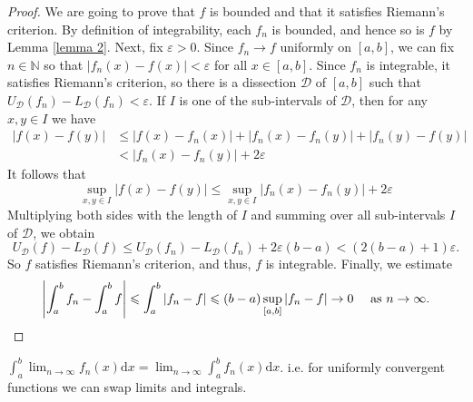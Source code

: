 \documentclass[a4paper]{article}
\begin{document}
\begin{proof}
    We are going to prove that $f$ is bounded and that it satisfies Riemann's criterion. By definition of integrability, each $f_{n}$ is bounded, and hence so is $f$ by Lemma \ref{lemma 2}.
    Next, fix $\varepsilon>0$. Since $f_{n} \rightarrow f$ uniformly on $[a, b]$, we can fix $n \in \mathbb{N}$ so that $\left|f_{n}(x)-f(x)\right|<\varepsilon$ for all $x \in[a, b]$. Since $f_{n}$ is integrable, it satisfies Riemann's criterion, so there is a dissection $\mathcal{D}$ of $[a, b]$ such that $U_{\mathcal{D}}\left(f_{n}\right)-L_{\mathcal{D}}\left(f_{n}\right)<\varepsilon$. If $I$ is one of the sub-intervals of $\mathcal{D}$, then for any $x, y \in I$ we have
    \[
    \begin{aligned}
    |f(x)-f(y)| & \leqslant\left|f(x)-f_{n}(x)\right|+\left|f_{n}(x)-f_{n}(y)\right|+\left|f_{n}(y)-f(y)\right| \\
    &<\left|f_{n}(x)-f_{n}(y)\right|+2 \varepsilon
    \end{aligned}
    \]
    It follows that
    \[
    \sup _{x, y \in I}|f(x)-f(y)| \leqslant \sup _{x, y \in I}\left|f_{n}(x)-f_{n}(y)\right|+2 \varepsilon
    \]
    Multiplying both sides with the length of $I$ and summing over all sub-intervals $I$ of $\mathcal{D}$, we obtain
    \[
    U_{\mathcal{D}}(f)-L_{\mathcal{D}}(f) \leqslant U_{\mathcal{D}}\left(f_{n}\right)-L_{\mathcal{D}}\left(f_{n}\right)+2 \varepsilon(b-a)<(2(b-a)+1) \varepsilon.
    \]
    So $f$ satisfies Riemann's criterion, and thus, $f$ is integrable.
    Finally, we estimate
    \[
    \left|\int_{a}^{b} f_{n}-\int_{a}^{b} f\right| \leqslant \int_{a}^{b}\left|f_{n}-f\right| \leqslant(b-a) \sup _{[a, b]}\left|f_{n}-f\right| \rightarrow 0 \quad \text { as } n \rightarrow \infty .\qedhere
    \]
\end{proof}
\begin{remark}
    $\int_{a}^{b} \lim _{n \rightarrow \infty} f_{n}(x) \mathrm{d} x=\lim _{n \rightarrow \infty} \int_{a}^{b} f_{n}(x) \mathrm{d} x$. i.e. for uniformly convergent functions we can swap limits and integrals.
\end{remark}
\end{document}
